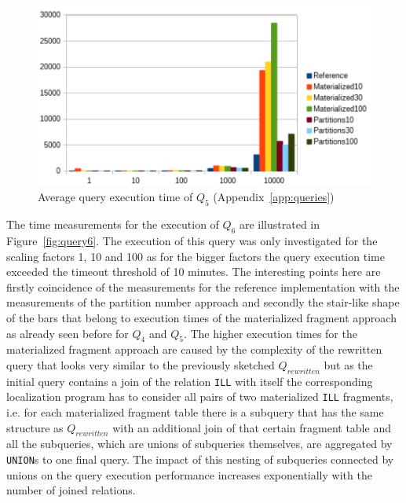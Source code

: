\begin{figure}[h]
    \centering
    \includegraphics[scale=0.8]{charts/Query5.pdf}
    \caption{Average query execution time of $Q_5$ (Appendix~\ref{app:queries})}
    \label{fig:query5}
\end{figure}



The time measurements for the execution of $Q_6$ are illustrated in Figure~\ref{fig:query6}. The execution of this query was only investigated for the scaling 
factors 1, 10 and 100 as for the bigger factors the query execution time exceeded the timeout threshold of 10 minutes. The interesting points here are firstly
coincidence of the measurements for the reference implementation with the measurements of the partition number approach and secondly the stair-like shape of
the bars that belong to execution times of the materialized fragment approach as already seen before for $Q_4$ and $Q_5$. The higher execution times for the
materialized fragment approach are caused by the complexity of the rewritten query that looks very similar to the previously sketched $Q_{rewritten}$ but as the
initial query contains a join of the relation \verb!ILL! with itself the corresponding localization program has to consider all pairs of two materialized
\verb!ILL! fragments, i.e. for each materialized fragment table there is a subquery that has the same structure as $Q_{rewritten}$ with an additional join of
that certain fragment table and all the subqueries, which are unions of subqueries themselves, are aggregated by \verb!UNION!s to one final query. The impact of
this nesting of subqueries connected by unions on the query execution performance increases exponentially with the number of joined relations.


